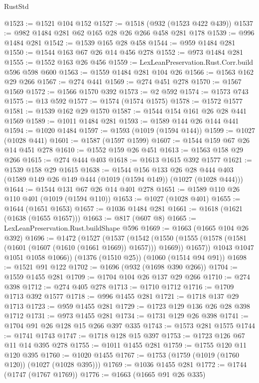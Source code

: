 \begin{lexlean}{RustStd}
\begin{coremodule}
@1523 := @1521 @104 @152
@1527 := @1518 (@932 (@1523 @422 @439))
@1537 := @982 @1484 @281 @62 @165 @28 @26 @266 @458 @281 @178
@1539 := @996 @1484 @281
@1542 := @1539 @165 @28 @458
@1544 := @959 @1484 @281
@1550 := @1544 @163 @67 @26 @14 @456 @278
@1552 := @973 @1484 @281
@1555 := @1552 @163 @26 @456
@1559 := LexLeanPreservation.Rust.Corr.build @596 @598 @600
@1563 := @1559 @1484 @281 @104 @26
@1566 := @1563 @162 @29 @266
@1567 := @274 @441
@1569 := @274 @451 @278
@1570 := @1567 @1569
@1572 := @1566 @1570 @392
@1573 := @2 @592
@1574 := @1573 @743
@1575 := @13 @592
@1577 := @1574 (@1574 @1575)
@1578 := @1572 @1577
@1581 := @1539 @162 @29 @1570
@1587 := @1544 @154 @161 @26 @28 @441 @1569
@1589 := @1011 @1484 @281
@1593 := @1589 @144 @26 @144 @441
@1594 := @1020 @1484
@1597 := @1593 (@1019 (@1594 @144))
@1599 := @1027 (@1028 @441)
@1601 := @1587 (@1597 @1599)
@1607 := @1544 @159 @67 @26 @14 @451 @278
@1610 := @1552 @159 @26 @451
@1613 := @1563 @158 @29 @266
@1615 := @274 @444 @403
@1618 := @1613 @1615 @392 @1577
@1621 := @1539 @158 @29 @1615
@1638 := @1544
    @156
    @133
    @26
    @28
    @444
    @403
    (@1589 @149 @26 @149 @444 (@1019 (@1594 @149)) (@1027 (@1028 @444)))
@1644 := @1544 @131 @67 @26 @14 @401 @278
@1651 := @1589 @110 @26 @110 @401 (@1019 (@1594 @110))
@1653 := @1027 (@1028 @401)
@1655 := @1644 (@1651 @1653)
@1657 := @1036 @1484 @281
@1661 := @1618 (@1621 (@1638 (@1655 @1657)))
@1663 := @817 (@607 @8)
@1665 := LexLeanPreservation.Rust.buildShape @596
@1669 := @1663 (@1665 @104 @26 @392)
@1696 := @1472
    (@1527
      (@1537
        (@1542
          (@1550 (@1555 (@1578 (@1581 (@1601 (@1607 (@1610 (@1661 @1669)) @1657))) @1669)) @1657))
        @1043
        @1047
        @1051
        @1058
        @1066))
    (@1376 (@1510 @25))
    (@1060 (@1514 @94 @91))
@1698 := @1521 @91 @122
@1702 := @1696 (@932 (@1698 @390 @266))
@1704 := @1559 @1455 @281
@1709 := @1704 @104 @26 @137 @29 @266
@1710 := @274 @398
@1712 := @274 @405 @278
@1713 := @1710 @1712
@1716 := @1709 @1713 @392 @1577
@1718 := @996 @1455 @281
@1721 := @1718 @137 @29 @1713
@1723 := @959 @1455 @281
@1729 := @1723 @129 @136 @26 @28 @398 @1712
@1731 := @973 @1455 @281
@1734 := @1731 @129 @26 @398
@1741 := @1704 @91 @26 @128 @15 @266 @397 @335
@1743 := @1573 @281 @1575
@1744 := @1741 @1743
@1747 := @1718 @128 @15 @397
@1753 := @1723 @126 @67 @11 @14 @395 @278
@1755 := @1011 @1455 @281
@1759 := @1755 @120 @11 @120 @395
@1760 := @1020 @1455
@1767 := @1753 (@1759 (@1019 (@1760 @120)) (@1027 (@1028 @395)))
@1769 := @1036 @1455 @281
@1772 := @1744 (@1747 (@1767 @1769))
@1776 := @1663 (@1665 @91 @26 @335)

\end{coremodule}
\end{lexlean}
